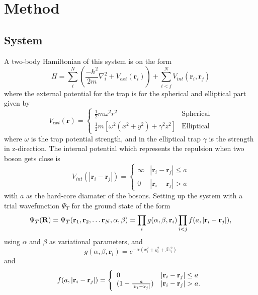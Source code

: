 \documentclass[12pt]{article}
\begin{document}
  \section{Method}
  \subsection{System}
  A two-body Hamiltonian of this system is on the form
  \begin{equation}
     H = \sum_i^N \left(\frac{-\hbar^2}{2m}\nabla^2_i + V_{ext}(\bm{r}_i)\right) + %
     \sum_{i< j}^N V_{int}(\bm{r}_i,\bm{r}_j)
  \end{equation}
  where the external potential for the trap is for the spherical and elliptical part
  given by
  \begin{equation}
    V_{ext}(\bm{r}) = \left\{%
      \begin{array}{lr}
	\frac{1}{2}m\omega^2r^2 & \text{Spherical}\\
	\frac{1}{2}m[\omega^2(x^2 + y^2) + \gamma^2z^2] & \text{Elliptical}
      \end{array}
      \right.
  \end{equation}
  where $\omega$ is the trap potential strength, and in the elliptical trap $\gamma$ is
  the strength in z-direction.
  The internal potential which represents the repulsion when two boson gets close is
  \begin{equation}
    V_{int}(|\bm{r}_i - \bm{r}_j|) = \left\{%
    \begin{array}{lr}
      \infty & |\bm{r}_i - \bm{r}_j| \leq a\\
      0 & |\bm{r}_i - \bm{r}_j| > a
    \end{array}
    \right.
  \end{equation}
  with $a$ as the hard-core diamater of the bosons.
  Setting up the system with a trial wavefunction $\Psi_T$ for the ground state of the form
  \begin{equation}
    \Psi_T({\bf R})=\Psi_T({\bf r}_1, {\bf r}_2, \dots {\bf r}_N,\alpha,\beta)=\prod_i%
    g(\alpha,\beta,{\bf r}_i)\prod_{i<j}f(a,|{\bf r}_i-{\bf r}_j|),
  \end{equation}
  using $\alpha$ and $\beta$ as variational parameters, and 
  \[ g(\alpha, \beta, \bm{r}_i) = e^{-\alpha(x_i^2 + y_i^2 + \beta z_i^2)} \]
  and
  \begin{equation}
    f(a,|{\bf r}_i-{\bf r}_j|)=\Bigg\{
    \begin{array}{ll}
      0 & {|{\bf r}_i-{\bf r}_j|} \leq {a}\\
	(1-\frac{a}{|{\bf r}_i-{\bf r}_j|}) & {|{\bf r}_i-{\bf r}_j|} > {a}.
    \end{array}
  \end{equation}  
\end{document}
